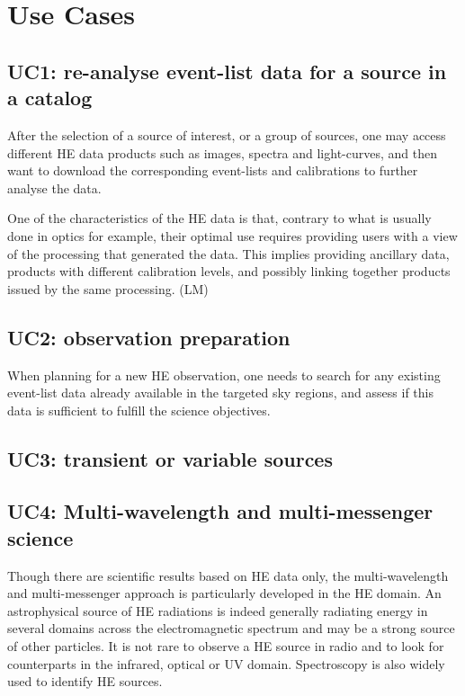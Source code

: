 \documentclass[11pt,a4paper]{ivoa}
\begin{document}
\section{Use Cases}

\subsection{UC1: re-analyse event-list data for a source in a catalog}

After the selection of a source of interest, or a group of sources, one may access different HE data products such as images, spectra and light-curves, and then want to download the corresponding event-lists and calibrations to further analyse the data.

One of the characteristics of the HE data is that, contrary to what is usually done in optics for example, their optimal use requires providing users with a view of the processing that generated the data. This implies providing ancillary data, products with different calibration levels, and possibly linking together products issued by the same processing.  (LM)


\subsection{UC2: observation preparation}

When planning for a new HE observation, one needs to search for any existing event-list data already available in the targeted sky regions, and assess if this data is sufficient to fulfill the science objectives.



\subsection{UC3: transient or variable sources}




\subsection{UC4: Multi-wavelength and multi-messenger science}

Though there are scientific results based on HE data only, the multi-wavelength and multi-messenger approach is particularly developed in the HE domain. An astrophysical source of HE radiations is indeed generally radiating energy in several domains across the electromagnetic spectrum and may be a strong source of other particles. It is not rare to observe a HE source in radio and to look for counterparts in the infrared, optical or UV domain. Spectroscopy is also widely used to identify HE sources.
\end{document}
